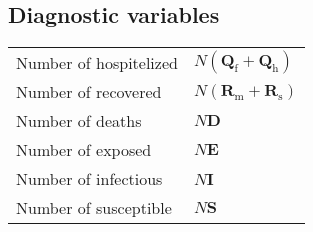 \documentclass[twoside,11pt]{article}
\newcommand{\rmf}{\mathrm{f}}
\newcommand{\rmh}{\mathrm{h}}
\newcommand{\rmm}{\mathrm{m}}
\newcommand{\rms}{\mathrm{s}}
\newcommand{\bmD}{{\mathbf{D}}}
\newcommand{\bmE}{{\mathbf{E}}}
\newcommand{\bmI}{{\mathbf{I}}}
\newcommand{\bmQ}{{\mathbf{Q}}}
\newcommand{\bmR}{{\mathbf{R}}}
\newcommand{\bmS}{{\mathbf{S}}}
\begin{document}
\subsection{Diagnostic variables}
\begin{center}
\begin{tabular}{ll}
\hline
Number of hospitelized & $N(\bmQ_\rmf + \bmQ_\rmh)$ \\
Number of recovered    & $N(\bmR_\rmm+\bmR_\rms)$ \\
Number of deaths       & $N\bmD$ \\
Number of exposed      & $N\bmE$ \\
Number of infectious   & $N\bmI$ \\
Number of susceptible  & $N\bmS$ \\
\hline
\end{tabular}
\end{center}



\end{document}
